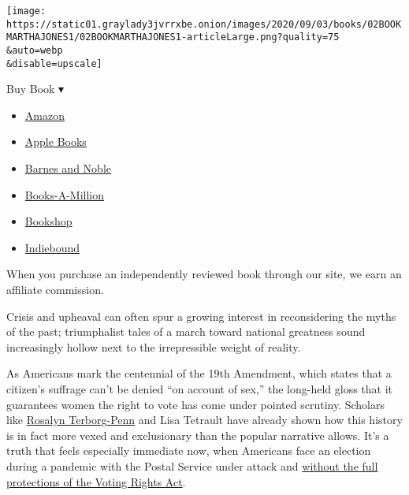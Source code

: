 \texttt{[image: https://static01.graylady3jvrrxbe.onion/images/2020/09/03/books/02BOOKMARTHAJONES1/02BOOKMARTHAJONES1-articleLarge.png?quality=75\\\&auto=webp\\\&disable=upscale]}

Buy Book ▾

\begin{itemize}
\tightlist
\item
  \href{https://www.amazon.com/gp/search?index=books\&tag=NYTBSREV-20\&field-keywords=Vanguard+Martha+S.+Jones}{Amazon}
\item
  \href{https://du-gae-books-dot-nyt-du-prd.appspot.com/buy?title=Vanguard\&author=Martha+S.+Jones}{Apple
  Books}
\item
  \href{https://www.anrdoezrs.net/click-7990613-11819508?url=https\%3A\%2F\%2Fwww.barnesandnoble.com\%2Fw\%2F\%3Fean\%3D9781541618619}{Barnes
  and Noble}
\item
  \href{https://www.anrdoezrs.net/click-7990613-35140?url=https\%3A\%2F\%2Fwww.booksamillion.com\%2Fp\%2FVanguard\%2FMartha\%2BS.\%2BJones\%2F9781541618619}{Books-A-Million}
\item
  \href{https://bookshop.org/a/3546/9781541618619}{Bookshop}
\item
  \href{https://www.indiebound.org/book/9781541618619?aff=NYT}{Indiebound}
\end{itemize}

When you purchase an independently reviewed book through our site, we
earn an affiliate commission.

Crisis and upheaval can often spur a growing interest in reconsidering
the myths of the past; triumphalist tales of a march toward national
greatness sound increasingly hollow next to the irrepressible weight of
reality.

As Americans mark the centennial of the 19th Amendment, which states
that a citizen's suffrage can't be denied ``on account of sex,'' the
long-held gloss that it guarantees women the right to vote has come
under pointed scrutiny. Scholars like
\href{https://www.nytimes3xbfgragh.onion/2019/01/04/obituaries/rosalyn-terborg-penn-dead.html}{Rosalyn
Terborg-Penn} and Lisa Tetrault have already shown how this history is
in fact more vexed and exclusionary than the popular narrative allows.
It's a truth that feels especially immediate now, when Americans face an
election during a pandemic with the Postal Service under attack and
\href{https://www.nytimes3xbfgragh.onion/2018/09/12/books/review-one-person-no-vote-carol-anderson.html}{without
the full protections of the Voting Rights Act}.

